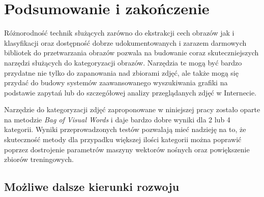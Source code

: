 \chapter{Podsumowanie i zakończenie}

Różnorodność technik służących zarówno do ekstrakcji cech obrazów jak i klasyfikacji oraz dostępność dobrze udokumentowanych i zarazem darmowych bibliotek do przetwarzania obrazów pozwala na budowanie coraz skuteczniejszych narzędzi służących do kategoryzacji obrazów. Narzędzia te mogą być bardzo przydatne nie tylko do zapanowania nad zbiorami zdjęć, ale także mogą się przydać do budowy systemów zaawansowanego wyszukiwania grafiki na podstawie zapytań lub do szczegółowej analizy przeglądanych zdjęć w Internecie.

Narzędzie do kategoryzacji zdjęć zaproponowane w niniejszej pracy zostało oparte na metodzie \emph{Bag of Visual Words} i daje bardzo dobre wyniki dla 2 lub 4 kategorii. Wyniki przeprowadzonych testów pozwalają mieć nadzieję na to, że skuteczność metody dla przypadku większej ilości kategorii można poprawić poprzez dostrojenie parametrów maszyny wektorów nośnych oraz powiększenie zbiorów treningowych.



\section{Możliwe dalsze kierunki rozwoju}

